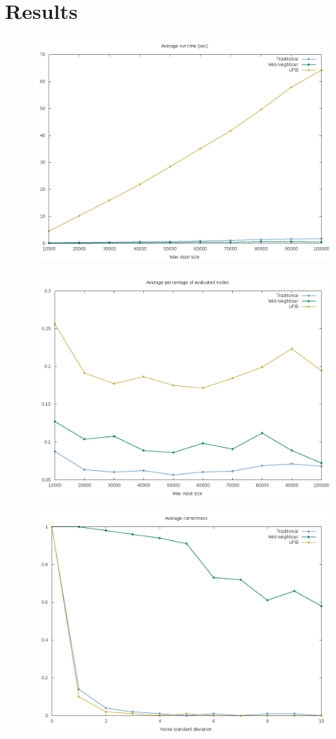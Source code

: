 \documentclass[12pt]{article}
\begin{document}
\section{Results}
\begin{figure}[H]
        \centering
        \includegraphics[scale=.5]{time_plot}
\end{figure}
\begin{figure}[H]
        \centering
        \includegraphics[scale=.5]{evaluations_plot}
\end{figure}
\begin{figure}[H]
        \centering
        \includegraphics[scale=.5]{correctness_plot}
\end{figure}
\end{document}
